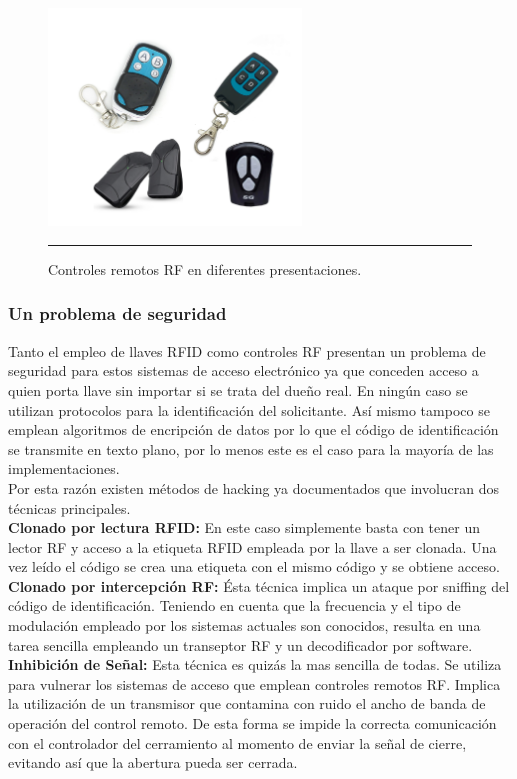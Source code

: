 \begin{figure}[htbp]
	\centering
	\includegraphics[width=0.6\textwidth]{Pictures/controlesrf.png}
	\rule{35em}{1pt}
	\caption[Controles RF]{Controles remotos RF en diferentes presentaciones. }
	\label{fig:controlesrf}
\end{figure}

\subsubsection{Un problema de seguridad}
Tanto el empleo de llaves RFID como controles RF presentan un problema de seguridad para estos sistemas de acceso electrónico ya que conceden acceso a quien porta llave sin importar si se trata del dueño real.
En ningún caso se utilizan protocolos para la identificación del solicitante. Así mismo tampoco se emplean algoritmos de  encripción de datos por lo que el código de identificación se transmite en texto plano, por lo menos este es el caso para la mayoría de las implementaciones.\\
Por esta razón existen métodos de hacking ya documentados que involucran dos técnicas principales.\\
\textbf{Clonado por lectura RFID:} En este caso simplemente basta con tener un lector RF y acceso a la etiqueta RFID empleada por la llave a ser clonada. Una vez leído el código se crea una etiqueta con el mismo código y se obtiene acceso.\\
\textbf{Clonado por intercepción RF:}  Ésta técnica implica un ataque por sniffing del código de identificación. Teniendo en cuenta que la frecuencia y el tipo de modulación empleado por los sistemas actuales son conocidos, resulta en una tarea sencilla empleando un transeptor RF y un decodificador por software.\\
\textbf{Inhibición de Señal:} Esta técnica es quizás la mas sencilla de todas. Se utiliza para vulnerar los sistemas de acceso que emplean controles remotos RF. Implica la utilización de un transmisor que contamina con ruido el ancho de banda de operación del control remoto. De esta forma se impide la correcta comunicación con el controlador del cerramiento al momento de enviar la señal de cierre, evitando así que la abertura pueda ser cerrada.

